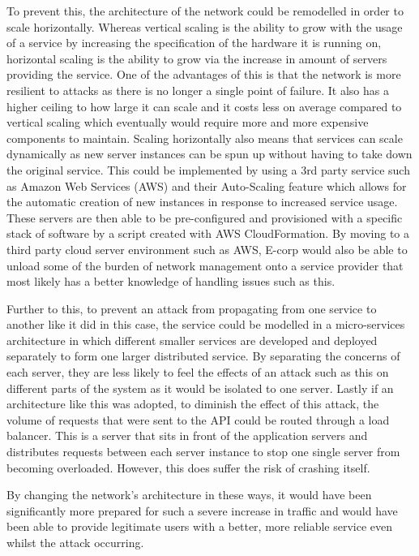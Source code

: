 \documentclass[]{report}
\begin{document}
To prevent this, the architecture of the network could be remodelled in order to scale horizontally. Whereas vertical scaling is the ability to grow with the usage of a service by increasing the specification of the hardware it is running on, horizontal scaling is the ability to grow via the increase in amount of servers providing the service. One of the advantages of this is that the network is more resilient to attacks as there is no longer a single point of failure. It also has a higher ceiling to how large it can scale and it costs less on average compared to vertical scaling which eventually would require more and more expensive components to maintain. Scaling horizontally also means that services can scale dynamically as new server instances can be spun up without having to take down the original service. This could be implemented by using a 3rd party service such as Amazon Web Services (AWS) and their Auto-Scaling feature which allows for the automatic creation of new instances in response to increased service usage. These servers are then able to be pre-configured and provisioned with a specific stack of software by a script created with AWS CloudFormation. By moving to a third party cloud server environment such as AWS, E-corp would also be able to unload some of the burden of network management onto a service provider that most likely has a better knowledge of handling issues such as this.

Further to this, to prevent an attack from propagating from one service to another like it did in this case, the service could be modelled in a micro-services architecture in which different smaller services are developed and deployed separately to form one larger distributed service. By separating the concerns of each server, they are less likely to feel the effects of an attack such as this on different parts of the system as it would be isolated to one server. Lastly if an architecture like this was adopted, to diminish the effect of this attack, the volume of requests that were sent to the API could be routed through a load balancer. This is a server that sits in front of the application servers and distributes requests between each server instance to stop one single server from becoming overloaded. However, this does suffer the risk of crashing itself.

By changing the network's architecture in these ways, it would have been significantly more prepared for such a severe increase in traffic and would have been able to provide legitimate users with a better, more reliable service even whilst the attack occurring.
\end{document}
